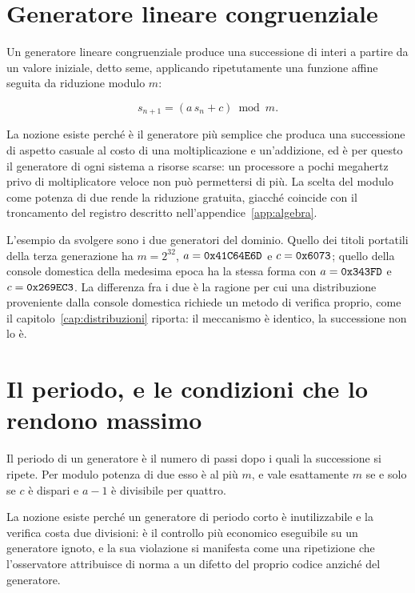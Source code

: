 \section{Generatore lineare congruenziale}

Un generatore lineare congruenziale produce una successione di interi a partire da un valore iniziale, detto seme, applicando ripetutamente una funzione affine seguita da riduzione modulo $m$:

\begin{equation}
s_{n+1} = (a\,s_n + c) \bmod m .
\end{equation}

La nozione esiste perché è il generatore più semplice che produca una successione di aspetto casuale al costo di una moltiplicazione e un'addizione, ed è per questo il generatore di ogni sistema a risorse scarse: un processore a pochi megahertz privo di moltiplicatore veloce non può permettersi di più. La scelta del modulo come potenza di due rende la riduzione gratuita, giacché coincide con il troncamento del registro descritto nell'appendice~\ref{app:algebra}.

L'esempio da svolgere sono i due generatori del dominio. Quello dei titoli portatili della terza generazione ha $m = 2^{32}$, $a = \texttt{0x41C64E6D}$ e $c = \texttt{0x6073}$; quello della console domestica della medesima epoca ha la stessa forma con $a = \texttt{0x343FD}$ e $c = \texttt{0x269EC3}$. La differenza fra i due è la ragione per cui una distribuzione proveniente dalla console domestica richiede un metodo di verifica proprio, come il capitolo~\ref{cap:distribuzioni} riporta: il meccanismo è identico, la successione non lo è.

\section{Il periodo, e le condizioni che lo rendono massimo}

Il periodo di un generatore è il numero di passi dopo i quali la successione si ripete. Per modulo potenza di due esso è al più $m$, e vale esattamente $m$ se e solo se $c$ è dispari e $a - 1$ è divisibile per quattro.

La nozione esiste perché un generatore di periodo corto è inutilizzabile e la verifica costa due divisioni: è il controllo più economico eseguibile su un generatore ignoto, e la sua violazione si manifesta come una ripetizione che l'osservatore attribuisce di norma a un difetto del proprio codice anziché del generatore.

